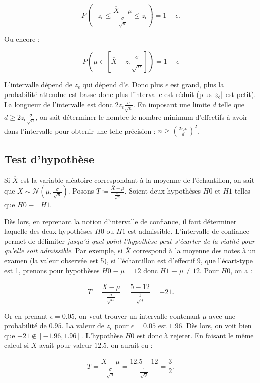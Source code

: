 \documentclass{article}
\begin{document}
		\[P\left(-z_\epsilon \leq \frac {\overline X-\mu}{\frac \sigma{\sqrt n}} \leq z_\epsilon\right) = 1-\epsilon.\]

		Ou encore :

		\[P\left(\mu \in \left[\overline X \pm z_\epsilon\frac \sigma{\sqrt n}\right]\right) = 1-\epsilon\]

		L'intervalle dépend de $z_\epsilon$ qui dépend d'$\epsilon$. Donc plus $\epsilon$ est grand, plus la probabilité attendue est basse donc plus l'intervalle est réduit (plus $\abs{z_\epsilon}$
		est petit). La longueur de l'intervalle est donc $2z_\epsilon\frac \sigma{\sqrt n}$. En imposant une limite $d$ telle que $d \geq 2z_\epsilon\frac \sigma{\sqrt n}$, on sait
		déterminer le nombre le nombre minimum d'effectifs à avoir dans l'intervalle pour obtenir une telle précision : $n \geq \left(\frac {2z_\epsilon\sigma}d\right)^2$.

	\subsection{Test d'hypothèse}
		Si $\overline X$ est la variable aléatoire correspondant à la moyenne de l'échantillon, on sait que $\overline X \sim \mathcal N\left(\mu, \frac \sigma{\sqrt n}\right)$.
		Posons $T \coloneqq \frac {\overline X - \mu}{\frac \sigma{\sqrt n}}$. Soient deux hypothèses $H0$ et $H1$ telles que $H0 \equiv \lnot H1$.

		Dès lors, en reprenant la notion d'intervalle de confiance, il faut déterminer laquelle des deux hypothèses $H0$ ou $H1$ est admissible. L'intervalle de confiance permet
		de délimiter \textit{jusqu'à quel point l'hypothèse peut s'écarter de la réalité pour qu'elle soit admissible}. Par exemple, si $\overline X$ correspond à la moyenne des notes à un
		examen (la valeur observée est 5), si l'échantillon est d'effectif 9, que l'écart-type est 1, prenons pour hypothèses $H0 \equiv \mu = 12$  donc $H1 \equiv \mu \neq 12$. Pour $H0$, on a :

		\[T = \frac {\overline X - \mu}{\frac \sigma{\sqrt n}} = \frac {5 - 12}{\frac 1{\sqrt 9}} = -21.\]

		Or en prenant $\epsilon = 0.05$, on veut trouver un intervalle contenant $\mu$ avec une probabilité de $0.95$. La valeur de $z_\epsilon$ pour $\epsilon = 0.05$ est $1.96$. Dès lors,
		on voit bien que $-21 \not\in [-1.96, 1.96]$. L'hypothèse $H0$ est donc à rejeter. En faisant le même calcul si $\overline X$ avait pour valeur $12.5$, on aurait eu :

		\[T = \frac {\overline X - \mu}{\frac \sigma{\sqrt n}} = \frac {12.5 - 12}{\frac 1{\sqrt 9}} = \frac 32.\]
\end{document}
